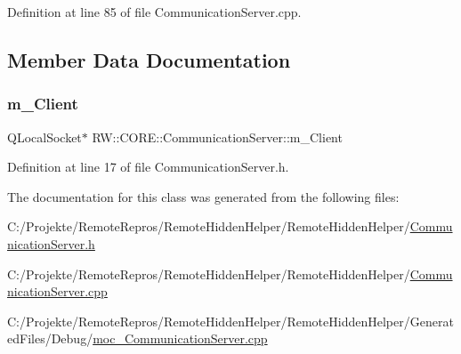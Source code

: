 Definition at line 85 of file Communication\+Server.\+cpp.



\subsection{Member Data Documentation}
\hypertarget{class_r_w_1_1_c_o_r_e_1_1_communication_server_a00d7ca97061231176a915058cf71d794}{}\label{class_r_w_1_1_c_o_r_e_1_1_communication_server_a00d7ca97061231176a915058cf71d794} 
\subsubsection{\texorpdfstring{m\+\_\+\+Client}{m\_Client}}
{\footnotesize\ttfamily Q\+Local\+Socket$\ast$ R\+W\+::\+C\+O\+R\+E\+::\+Communication\+Server\+::m\+\_\+\+Client\hspace{0.3cm}{\ttfamily [private]}}



Definition at line 17 of file Communication\+Server.\+h.



The documentation for this class was generated from the following files\+:\begin{DoxyCompactItemize}
\item 
C\+:/\+Projekte/\+Remote\+Repros/\+Remote\+Hidden\+Helper/\+Remote\+Hidden\+Helper/\hyperlink{_communication_server_8h}{Communication\+Server.\+h}\item 
C\+:/\+Projekte/\+Remote\+Repros/\+Remote\+Hidden\+Helper/\+Remote\+Hidden\+Helper/\hyperlink{_communication_server_8cpp}{Communication\+Server.\+cpp}\item 
C\+:/\+Projekte/\+Remote\+Repros/\+Remote\+Hidden\+Helper/\+Remote\+Hidden\+Helper/\+Generated\+Files/\+Debug/\hyperlink{_debug_2moc___communication_server_8cpp}{moc\+\_\+\+Communication\+Server.\+cpp}\end{DoxyCompactItemize}
